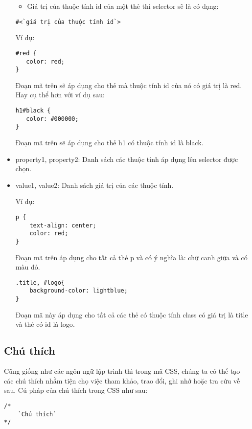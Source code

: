 \begin{itemize}
\begin{itemize}
\item	Giá trị của thuộc tính {\ttfamily id} của một thẻ thì {\ttfamily selector} sẽ là có dạng:
\end{itemize}
\lstset{language=XML}
\begin{lstlisting}[escapechar=`]
	#<`giá trị của thuộc tính id`>
\end{lstlisting}

Ví dụ:
\lstset{language=XML}
\begin{lstlisting}[escapechar=`]
#red {
   color: red; 
}
\end{lstlisting}
Đoạn mã trên sẽ áp dụng cho thẻ mà thuộc tính {\ttfamily id} của nó có giá trị là {\ttfamily red}. Hay cụ thể hơn với ví dụ sau:
\lstset{language=XML}
\begin{lstlisting}[escapechar=`]
h1#black {
   color: #000000; 
}
\end{lstlisting}

Đoạn mã trên sẽ áp dụng cho thẻ {\ttfamily h1} có thuộc tính {\ttfamily id} là {\ttfamily black}.

\item	{\ttfamily property1, property2}: Danh sách các thuộc tính áp dụng lên {\ttfamily selector} được chọn.
\item	{\ttfamily value1, value2}: Danh sách giá trị của các thuộc tính.


Ví dụ:
\lstset{language=XML}
\begin{lstlisting}[escapechar=`]
p {
	text-align: center;
	color: red;
}
\end{lstlisting}
Đoạn mã trên áp dụng cho tất cả thẻ {\ttfamily  p} và có ý nghĩa là: chữ canh giữa và có màu đỏ.

\lstset{language=XML}
\begin{lstlisting}[escapechar=`]
.title, #logo{
	background-color: lightblue;
}
\end{lstlisting}


Đoạn mã này áp dụng cho tất cả các thẻ có thuộc tính {\ttfamily  class } có giá trị là {\ttfamily title} và thẻ có {\ttfamily id} là {\ttfamily logo}.
\end{itemize} 
\subsection {Chú thích}
Cũng giống như các ngôn ngữ lập trình thì trong mã CSS, chúng ta có thể tạo các chú thích nhằm tiện chọ việc tham khảo, trao đổi, ghi nhớ hoặc tra cứu về sau. Cú pháp của chú thích trong CSS như sau:
\lstset{language=XML}
\begin{lstlisting}[escapechar=`]
/* 
	`Chú thích`
*/
\end{lstlisting}

